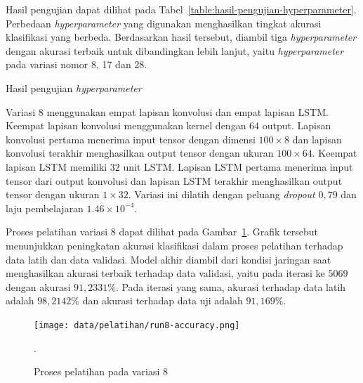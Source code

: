 Hasil pengujian dapat dilihat pada Tabel~\ref{table:hasil-pengujian-hyperparameter}. Perbedaan \textit{hyperparameter} yang digunakan menghasilkan tingkat akurasi klasifikasi yang berbeda. Berdasarkan hasil tersebut, diambil tiga \textit{hyperparameter} dengan akurasi terbaik untuk dibandingkan lebih lanjut, yaitu \textit{hyperparameter} pada variasi nomor 8, 17 dan 28.

\begin{table}[h!]
    \centering
    \caption{Hasil pengujian \textit{hyperparameter}}
    \label{table:hasil-pengujian-hyperparameter}
\end{table}

Variasi 8 menggunakan empat lapisan konvolusi dan empat lapisan LSTM\@. Keempat lapisan konvolusi menggunakan kernel dengan $64$ output. Lapisan konvolusi pertama menerima input tensor dengan dimensi $100 \times 8$ dan lapisan konvolusi terakhir menghasilkan output tensor dengan ukuran $100 \times 64$. Keempat lapisan LSTM memiliki $32$ unit LSTM\@. Lapisan LSTM pertama menerima input tensor dari output konvolusi dan lapisan LSTM terakhir menghasilkan output tensor dengan ukuran $1 \times 32$. Variasi ini dilatih dengan peluang \textit{dropout} $0,79$ dan laju pembelajaran $1.46 \times 10^{-4}$.

Proses pelatihan variasi 8 dapat dilihat pada Gambar~\ref{gambar:run8-training}. Grafik tersebut menunjukkan peningkatan akurasi klasifikasi dalam proses pelatihan terhadap data latih dan data validasi. Model akhir diambil dari kondisi jaringan saat menghasilkan akurasi terbaik terhadap data validasi, yaitu pada iterasi ke $5069$ dengan akurasi $91,2331\%$. Pada iterasi yang sama, akurasi terhadap data latih adalah $98,2142\%$ dan akurasi terhadap data uji adalah $91,169\%$.

\begin{figure}[h!]
    \centering
    \texttt{[image: data/pelatihan/run8-accuracy.png]}
    \caption{Proses pelatihan pada variasi 8}.
    \label{gambar:run8-training}
\end{figure}


